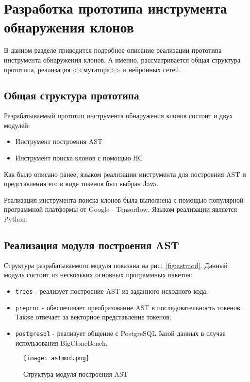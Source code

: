 \chapter{Разработка прототипа инструмента обнаружения клонов}

В данном разделе приводится подробное описание реализации прототипа инструмента обнаружения клонов. А именно, рассматривается общая структура прототипа, реализация <<мутатора>>  и нейронных сетей.

\section{Общая структура прототипа}

Разрабатываемый прототип инструмента обнаружения клонов состоит и двух модулей:
\begin{itemize}
\setlength\itemsep{0mm}
\item Инструмент построения AST
\item Инструмент поиска клонов с помощью НС
\end{itemize}

Как было описано ранее, языком реализации инструмента для построения AST и представления его в виде токенов был выбран Java.

Реализация инструмента поиска клонов была выполнена с помощью популярной программной платформы от Google -  Tensorflow. Языком реализации является Python.

\section{Реализация модуля построения AST}

Структура разрабатываемого модуля показана на рис.~\ref{fig:astmod}. Данный модуль состоит из нескольких основных программных пакетов:

\begin{itemize}
\setlength\itemsep{0mm}
\item \texttt{trees} - реализует построение AST из заданного исходного кода;
\item \texttt{preproc} - обеспечивает преобразование AST в последовательность токенов. Также отвечает за векторное представление токенов;
\item \texttt{postgresql} - реализует общение с PostgreSQL базой данных в случае использования BigCloneBench.
\end{itemize}


\begin{figure}[htbp]
\centering
\texttt{[image: astmod.png]}
\caption{Структура модуля построения AST}
\label{fig:mut_stages}
\end{figure}


